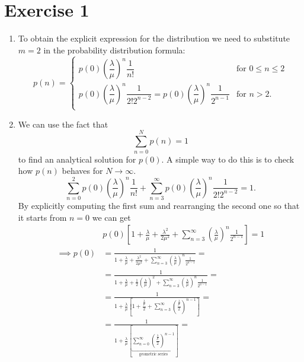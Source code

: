 \documentclass[12pt,a4paper]{article}
\begin{document}
	\section*{Exercise 1}
	\begin{enumerate}
		\item To obtain the explicit expression for the distribution we need to substitute $m=2$ in the probability distribution formula:
		\begin{equation*}
			p(n)=\begin{cases}
				p(0)\left(\dfrac{\lambda}{\mu}\right)^{n}\dfrac{1}{n!}&\text{for }0\leqslant n\leqslant 2\\
				p(0)\left(\dfrac{\lambda}{\mu}\right)^{n}\dfrac{1}{2!2^{n-2}}=	p(0)\left(\dfrac{\lambda}{\mu}\right)^{n}\dfrac{1}{2^{n-1}}&\text{for }n> 2.\\
			\end{cases}
		\end{equation*}
		\item We can use the fact that 
		\[\sum_{n=0}^Np(n)=1\]
		to find an analytical solution for $p(0)$. A simple way to do this is to check how $p(n)$ behaves for $N\to\infty$. 
		\begin{equation*}
			\sum^2_{n=0}p(0)\left(\frac{\lambda}{\mu}\right)^{n}\frac{1}{n!}+\sum_{n=3}^{\infty}p(0)\left(\frac{\lambda}{\mu}\right)^{n}\frac{1}{2!2^{n-2}}=1.
		\end{equation*}
		By explicitly computing the first sum and rearranging the second one so that it starts from $n=0$ we can get
		\begin{align*}
			&p(0)\left[1+\frac{\lambda}{\mu}+\frac{\lambda^{2}}{2\mu^{2}}+\sum_{n=3}^{\infty}\left(\frac{\lambda}{\mu}\right)^{n}\frac{1}{2^{n-1}}\right]=1\\
			\implies p(0)&=\frac{1}{1+\frac{\lambda}{\mu}+\frac{\lambda^{2}}{2\mu^{2}}+\sum_{n=3}^{\infty}\left(\frac{\lambda}{\mu}\right)^{n}\frac{1}{2^{n-1}}}=\\
			&=\frac{1}{1+\frac{\lambda}{\mu}+\frac{1}{2}\left(\frac{\lambda}{\mu}\right)^{2}+\sum_{n=3}^{\infty}\left(\frac{\lambda}{\mu}\right)^{n}\frac{1}{2^{n-1}}}=\\
			&=\frac{1}{1+\frac{\lambda}{\mu}\left[1+\frac{\frac{\lambda}{\mu}}{2}+\sum_{n=3}^{\infty}\left(\frac{\frac{\lambda}{\mu}}{2}\right)^{n-1}\right]}=\\
			&=\frac{1}{1+\frac{\lambda}{\mu}\left[\underbracket{\sum_{n=0}^{\infty}\left(\frac{\frac{\lambda}{\mu}}{2}\right)^{n-1}}_{\text{geometric series}}\right]}=\\

\end{align*}
\end{enumerate}
\end{document}
